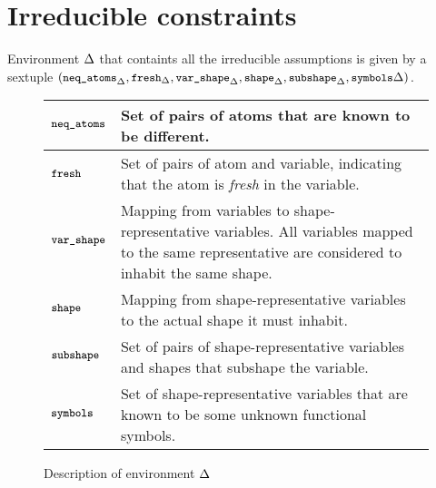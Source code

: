 \documentclass[english, mgr]{iithesis}
\renewcommand{\tt}[1]{\texttt{\small{#1}}}
\renewcommand{\it}[1]{\textit{#1}}
\newcommand{\NeqAtoms}{\tt{neq\_atoms}}
\newcommand{\Fresh}{\tt{fresh}}
\newcommand{\VarShape}{\tt{var\_shape}}
\newcommand{\Shape}{\tt{shape}}
\newcommand{\Subshape}{\tt{subshape}}
\newcommand{\Symbols}{\tt{symbols}}
\begin{document}
\section{Irreducible constraints} \label{sec:solverenv}
Environment $\Delta$ that containts all the irreducible assumptions is given by
a sextuple
$(\NeqAtoms_{\icEnv}
, \Fresh_{\icEnv}
, \VarShape_{\icEnv}
, \Shape_{\icEnv}
, \Subshape_{\icEnv}
, \Symbols{\icEnv}
)$.
\begin{figure}[h]
  \begin{tabularx}{\textwidth}{|l|X|}
  \hline
    $\NeqAtoms$ & Set of pairs of atoms that are known to be different. \\
  \hline
    $\Fresh$ & Set of pairs of atom and variable, indicating that the atom is \it{fresh} in the variable. \\
  \hline
    $\VarShape$ & Mapping from variables to shape-representative variables. All variables mapped to the same representative are considered to inhabit the same shape. \\
  \hline
    $\Shape$ & Mapping from shape-representative variables to the actual shape it must inhabit. \\
  \hline
    $\Subshape$ & Set of pairs of shape-representative variables and
    shapes that subshape the variable. \\
  \hline
    $\Symbols$ & Set of shape-representative variables that are known to be some unknown functional symbols. \\
  \hline
  \end{tabularx}
  \caption{Description of environment $\Delta$}
  \label{fig:assumption-equality-rules}
\end{figure}
\end{document}
